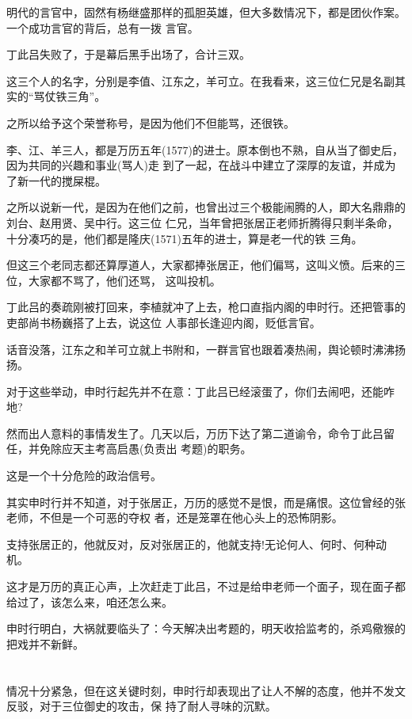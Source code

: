 \documentclass[11pt,a4paper,onecolumn]{article}
\begin{document}
明代的言官中，固然有杨继盛那样的孤胆英雄，但大多数情况下，都是团伙作案。一个成功言官的背后，总有一拨
言官。

丁此吕失败了，于是幕后黑手出场了，合计三双。

这三个人的名字，分别是李值、江东之，羊可立。在我看来，这三位仁兄是名副其实的``骂仗铁三角''。

之所以给予这个荣誉称号，是因为他们不但能骂，还很铁。

李、江、羊三人，都是万历五年(1577)的进士。原本倒也不熟，自从当了御史后，因为共同的兴趣和事业(骂人)走
到了一起，在战斗中建立了深厚的友谊，并成为了新一代的搅屎棍。

之所以说新一代，是因为在他们之前，也曾出过三个极能闹腾的人，即大名鼎鼎的刘台、赵用贤、吴中行。这三位
仁兄，当年曾把张居正老师折腾得只剩半条命，十分凑巧的是，他们都是隆庆(1571)五年的进士，算是老一代的铁
三角。

但这三个老同志都还算厚道人，大家都捧张居正，他们偏骂，这叫义愤。后来的三位，大家都不骂了，他们还骂，
这叫投机。

丁此吕的奏疏刚被打回来，李植就冲了上去，枪口直指内阁的申时行。还把管事的吏部尚书杨巍搭了上去，说这位
人事部长逢迎内阁，贬低言官。

话音没落，江东之和羊可立就上书附和，一群言官也跟着凑热闹，舆论顿时沸沸扬扬。

对于这些举动，申时行起先并不在意：丁此吕已经滚蛋了，你们去闹吧，还能咋地?

然而出人意料的事情发生了。几天以后，万历下达了第二道谕令，命令丁此吕留任，并免除应天主考高启愚(负责出
考题)的职务。

这是一个十分危险的政治信号。

其实申时行并不知道，对于张居正，万历的感觉不是恨，而是痛恨。这位曾经的张老师，不但是一个可恶的夺权
者，还是笼罩在他心头上的恐怖阴影。

支持张居正的，他就反对，反对张居正的，他就支持!无论何人、何时、何种动机。

这才是万历的真正心声，上次赶走丁此吕，不过是给申老师一个面子，现在面子都给过了，该怎么来，咱还怎么来。

申时行明白，大祸就要临头了：今天解决出考题的，明天收拾监考的，杀鸡儆猴的把戏并不新鲜。

\section[\thesection]{}

情况十分紧急，但在这关键时刻，申时行却表现出了让人不解的态度，他并不发文反驳，对于三位御史的攻击，保
持了耐人寻味的沉默。
\end{document}
